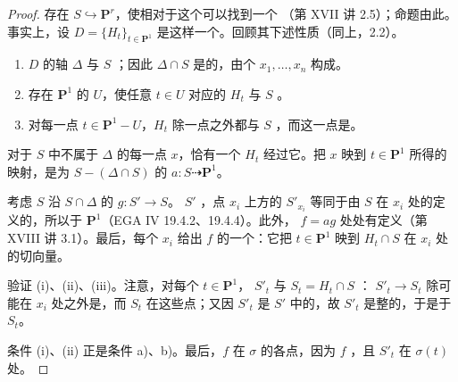 \begin{proof}
存在 $S\hookrightarrow\mathbf P^r$，使相对于这个可以找到一个 （第 XVII 讲 2.5）；命题由此。事实上，设 $D=\{H_t\}_{t\in\mathbf P^1}$ 是这样一个。回顾其下述性质（同上，2.2）。
\begin{enumerate}
\item[a)] $D$ 的轴 $\Delta$ 与 $S$ ；因此 $\Delta\cap S$ 是的，由个 $x_1,\ldots,x_n$ 构成。
\item[b)] 存在 $\mathbf P^1$ 的 $U$，使任意 $t\in U$ 对应的 $H_t$ 与 $S$ 。
\item[c)] 对每一点 $t\in\mathbf P^1-U$，$H_t$ 除一点之外都与 $S$ ，而这一点是。
\end{enumerate}
对于 $S$ 中不属于 $\Delta$ 的每一点 $x$，恰有一个 $H_t$ 经过它。把 $x$ 映到 $t\in\mathbf P^1$ 所得的映射，是为 $S-(\Delta\cap S)$ 的 $a:S\dashrightarrow\mathbf P^1$。

考虑 $S$ 沿 $S\cap\Delta$ 的 $g:S'\to S$。 $S'$ ，点 $x_i$ 上方的 $S'_{x_i}$ 等同于由 $S$ 在 $x_i$ 处的定义的，所以于 $\mathbf P^1$（EGA IV 19.4.2、19.4.4）。此外， $f=ag$ 处处有定义（第 XVIII 讲 3.1）。最后，每个 $x_i$ 给出 $f$ 的一个：它把 $t\in\mathbf P^1$ 映到 $H_t\cap S$ 在 $x_i$ 处的切向量。

验证 (i)、(ii)、(iii)。注意，对每个 $t\in\mathbf P^1$， $S'_t$ 与 $S_t=H_t\cap S$ ： $S'_t\to S_t$ 除可能在 $x_i$ 处之外是，而 $S_t$ 在这些点；又因 $S'_t$ 是 $S'$ 中的，故 $S'_t$ 是整的，于是于 $S_t$。

条件 (i)、(ii) 正是条件 a)、b)。最后，$f$ 在 $\sigma$ 的各点，因为 $f$ ，且 $S'_t$ 在 $\sigma(t)$ 处。
\end{proof}
